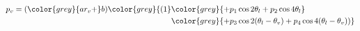 \begin{align}
p_v=(\color{grey}{ar_v+}b)\color{grey}{(1} &\color{grey}{+ p_1\cos 2\theta_l + p_2\cos 4\theta_l } \\
                                           & \color{grey}{+p_3\cos 2(\theta_l-\theta_v) + p_4\cos 4(\theta_l-\theta_v))}
\end{align}
